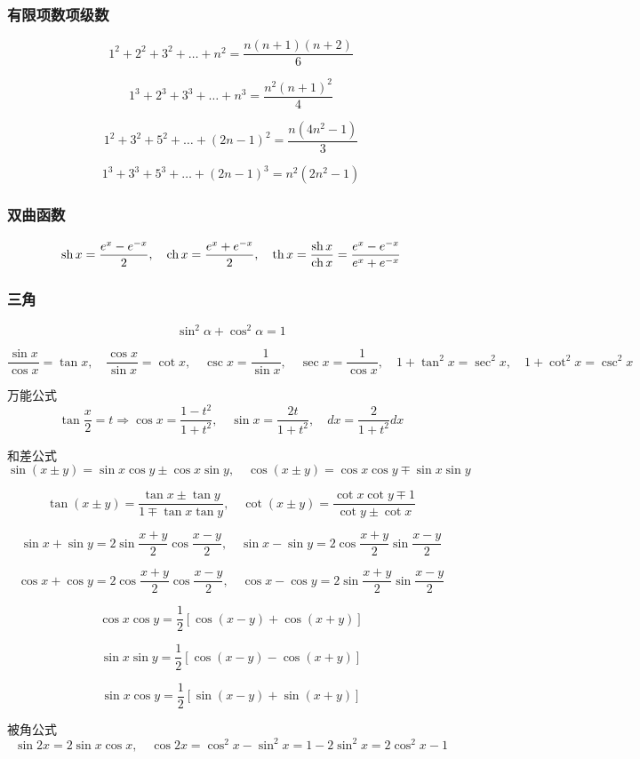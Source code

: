 \documentclass{article}
\begin{document}
\subsubsection{有限项数项级数}
$$
1^2 + 2^2 +3^2+\ldots+n^2=\frac{ n(n+1)(n+2)}{6}
$$

$$
1^3 + 2^3 +3^3+\ldots+n^3=\frac{ n^2(n+1)^2}{4}
$$

$$
1^2+3^2+5^2+\ldots+(2n-1)^2=\frac{n(4n^2-1)}{3}
$$

$$
1^3 + 3^3 +5^3+\ldots+(2n-1)^3=n^2(2n^2-1)
$$

\subsubsection{双曲函数}
$$
\operatorname{sh} x=\frac{e^x - e^{-x}}{2}, \quad \operatorname{ch} x=\frac{e^x+e^{-x}}{2}, \quad \operatorname{th} x = \frac{ \operatorname{sh} x}{\operatorname{ch} x}=\frac{e^x-e^{-x}}{e^x + e^{-x}}
$$

\subsubsection{三角}
$$
\sin ^2 \alpha + \cos^2 \alpha=1
$$

$$
\frac{ \sin x}{\cos x}=\tan x, \quad
\frac{ \cos x}{\sin x}=\cot x, \quad
\csc x=\frac{1}{\sin x}, \quad
\sec x=\frac{ 1}{\cos x}, \quad
1+\tan^2 x=\sec^2 x,\quad
1+\cot^2 x=\csc^2 x
$$

万能公式
$$
\tan \frac{x}{2}=t \Rightarrow
\cos x =\frac{ 1-t^2}{1+t^2},\quad
\sin x=\frac{2t}{1+t^2},\quad
dx=\frac{2}{1+t^2}dx
$$

和差公式
$$
\sin(x\pm y)=\sin x \cos y \pm \cos x \sin y,\quad \cos(x \pm y)=\cos x \cos y \mp \sin x \sin y
$$

$$
\tan(x \pm y)=\frac{\tan x \pm \tan y}{1 \mp \tan x \tan y}, \quad
\cot (x\pm y)=\frac{\cot x \cot y \mp 1}{\cot y \pm \cot x}
$$

$$
\sin x+\sin y=2\sin \frac{x+y}{2} \cos \frac{ x -y }{2}, \quad
\sin x-\sin y=2\cos \frac{x+y}{2} \sin \frac{ x -y }{2}
$$

$$
\cos x+\cos y=2\cos \frac{x+y}{2} \cos \frac{ x -y }{2}, \quad
\cos x-\cos y=2\sin \frac{x+y}{2} \sin \frac{ x -y }{2}
$$

$$
\cos x \cos y=\frac{ 1}{2}[\cos(x-y)+\cos(x+y)]
$$

$$
\sin x \sin y=\frac{ 1}{2}[\cos(x-y)-\cos(x+y)]
$$

$$
\sin x \cos y=\frac{ 1}{2}[\sin(x-y)+\sin(x+y)]
$$

被角公式
$$
\sin 2x=2\sin x \cos x,\quad \cos 2x=\cos^2 x-\sin ^2 x=1-2\sin^2 x=2\cos^2 x -1
$$
\end{document}

